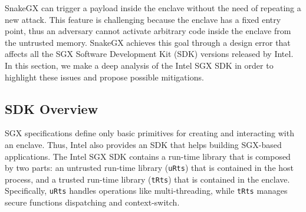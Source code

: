 SnakeGX can trigger a payload inside the enclave without the need of repeating 
a new attack.
This feature is challenging because the enclave has a fixed 
entry point, thus an adversary cannot activate arbitrary code inside the 
enclave from the untrusted memory.
SnakeGX achieves this goal through a design error that affects all 
the SGX Software Development Kit (SDK) versions released by Intel.
In this section, we make a deep analysis of the Intel SGX SDK in order to 
highlight these issues and propose possible mitigations.

\subsection{SDK Overview}
\label{ssec:sdk-overview}

SGX specifications define only basic primitives for creating and interacting 
with an enclave.
Thus, Intel also provides an SDK that helps building SGX-based applications.
The Intel SGX SDK contains a run-time library that is composed by two parts: an 
untrusted run-time library (\texttt{uRts}) that is contained in the host 
process, and a trusted run-time library (\texttt{tRts}) that is contained in 
the enclave.
Specifically, \texttt{uRts} handles operations like multi-threading, while 
\texttt{tRts} manages secure functions dispatching and context-switch. 

